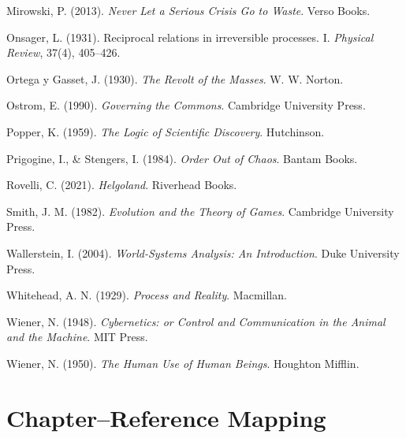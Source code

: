 \documentclass[11pt,a4paper,titlepage]{article}
\theoremstyle{definition}
\begin{document}
\begin{itemize}
\begin{thebibliography}{99}
Mirowski, P. (2013).
\newblock \emph{Never Let a Serious Crisis Go to Waste}.
\newblock Verso Books.

Onsager, L. (1931).
\newblock Reciprocal relations in irreversible processes. I.
\newblock \emph{Physical Review}, 37(4), 405–426.

Ortega y Gasset, J. (1930).
\newblock \emph{The Revolt of the Masses}.
\newblock W. W. Norton.

Ostrom, E. (1990).
\newblock \emph{Governing the Commons}.
\newblock Cambridge University Press.

Popper, K. (1959).
\newblock \emph{The Logic of Scientific Discovery}.
\newblock Hutchinson.

Prigogine, I., \& Stengers, I. (1984).
\newblock \emph{Order Out of Chaos}.
\newblock Bantam Books.

Rovelli, C. (2021).
\newblock \emph{Helgoland}.
\newblock Riverhead Books.

Smith, J. M. (1982).
\newblock \emph{Evolution and the Theory of Games}.
\newblock Cambridge University Press.

Wallerstein, I. (2004).
\newblock \emph{World-Systems Analysis: An Introduction}.
\newblock Duke University Press.

Whitehead, A. N. (1929).
\newblock \emph{Process and Reality}.
\newblock Macmillan.

Wiener, N. (1948).
\newblock \emph{Cybernetics: or Control and Communication in the Animal and the Machine}.
\newblock MIT Press.

Wiener, N. (1950).
\newblock \emph{The Human Use of Human Beings}.
\newblock Houghton Mifflin.

\end{thebibliography}

\section*{Chapter–Reference Mapping}


\end{itemize}
\end{document}
